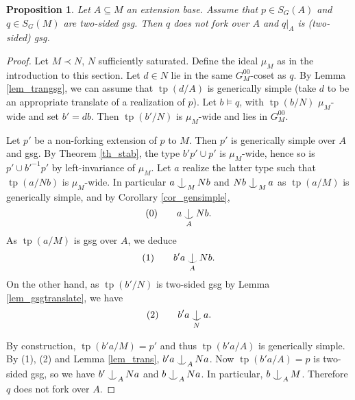 \documentclass{amsart}
\makeatletter
\numberwithin{equation}{section}
\newtheorem{prop}[thm]{Proposition}
\theoremstyle{definition}
\theoremstyle{mystyle}
\theoremstyle{remark}
\DeclareMathOperator{\tp}{tp}
\def\indsym#1#2{%
 \setbox0=\hbox{$\m@th#1x$}%
 \kern\wd0%
 \hbox to 0pt{\hss$\m@th#1\mid$\hbox to 0pt{$\m@th#1^{#2}$\hss}\hss}%
 \lower.9\ht0\hbox to 0pt{\hss$\m@th#1\smile$\hss}%
 \kern\wd0}
\newcommand{\ind}[1][]{\mathop{\mathpalette\indsym{#1}}}
\makeatother
\begin{document}
\begin{prop}\label{prop_gsgkiller}
Let $A\subseteq M$ an extension base. Assume that $p\in S_G(A)$ and $q\in S_G(M)$ are two-sided gsg. Then $q$ does not fork over $A$ and $q|_A$ is (two-sided) gsg.
\end{prop}
\begin{proof}

Let $M\prec N$, $N$ sufficiently saturated. Define the ideal $\mu_M$ as in the introduction to this section. Let $d\in N$ lie in the same $G^{00}_M$-coset as $q$. By Lemma \ref{lem_trangsg}, we can assume that $\tp(d/A)$ is generically simple (take $d$ to be an appropriate translate of a realization of $p$). Let $b\models q$, with $\tp(b/N)$ $\mu_M$-wide and set $b'=db$. Then $\tp(b'/N)$ is $\mu_M$-wide and lies in $G^{00}_M$.


Let $p'$ be a non-forking extension of $p$ to $M$. Then $p'$ is generically simple over $A$ and gsg. By Theorem \ref{th_stab}, the type $b'p'\cup p'$ is $\mu_M$-wide, hence so is $p'\cup b'^{-1}p'$ by left-invariance of $\mu_M$. Let $a$ realize the latter type such that $\tp(a/Nb)$ is $\mu_M$-wide. In particular $a\ind_M Nb$ and $Nb\ind_M a$ as $\tp(a/M)$ is generically simple, and by Corollary \ref{cor_gensimple}, $$(0)\qquad a\ind_A Nb.$$
As $\tp(a/M)$ is gsg over $A$, we deduce
\[(1)\qquad b'a\ind_A Nb.\]
On the other hand, as $\tp(b'/N)$ is two-sided gsg by Lemma \ref{lem_gsgtranslate}, we have 
$$(2)\qquad b'a\ind_N a.$$

By construction, $\tp(b'a/M)=p'$ and thus $\tp(b'a/A)$ is generically simple. By (1), (2) and Lemma \ref{lem_trans}, $b'a\ind_A Na$. Now $\tp(b'a/A)=p$ is two-sided gsg, so we have $b'\ind_A Na$ and $b\ind_A Na$. In particular, $b\ind_A M$. Therefore $q$ does not fork over $A$.



\end{proof}
\end{document}
